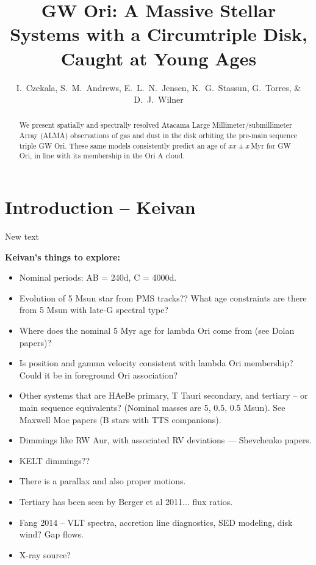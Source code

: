 \documentclass{aastex6}
\begin{document}
\title{GW Ori: A Massive Stellar Systems with a Circumtriple Disk, Caught at Young Ages}
\author{I.~Czekala, S.~M.~Andrews, E.~L.~N.~Jensen, K.~G.~Stassun, G.~Torres, \& D.~J.~Wilner}



\begin{abstract}
We present spatially and spectrally resolved Atacama Large Millimeter/submillimeter Array (ALMA) observations of gas and dust in the disk orbiting the pre-main sequence triple GW Ori. These same models consistently predict an age of $xx\pm x$\,Myr for GW Ori, in line with its membership in the Ori A cloud.
\end{abstract}


\section{Introduction -- {\bf Keivan} \label{sec:intro}}

New text

\noindent
{\bf Keivan's things to explore:}
\begin{itemize}
\item Nominal periods: AB = 240d, C = 4000d.
\item Evolution of 5 Msun star from PMS tracks?? What age constraints are there from 5 Msun with late-G spectral type?
\item Where does the nominal 5 Myr age for lambda Ori come from (see Dolan papers)?
\item Is position and gamma velocity consistent with lambda Ori membership? Could it be in foreground Ori association?
\item Other systems that are HAeBe primary, T Tauri secondary, and tertiary -- or main sequence equivalents? (Nominal masses are 5, 0.5, 0.5 Msun). See Maxwell Moe papers (B stars with TTS companions).
\item Dimmings like RW Aur, with associated RV deviations --- Shevchenko papers.
\item KELT dimmings??
\item There is a parallax and also proper motions.
\item Tertiary has been seen by Berger et al 2011... flux ratios.
\item Fang 2014 -- VLT spectra, accretion line diagnostics, SED modeling, disk wind? Gap flows.
\item X-ray source?
\end{itemize}
\end{document}
